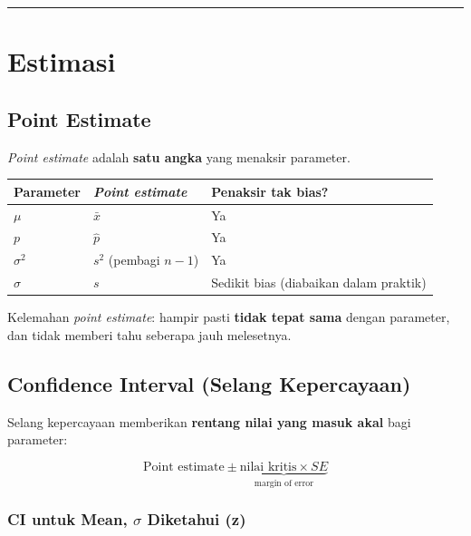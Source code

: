 \documentclass[
  indonesian,
  letterpaper,
]{book}
\newcounter{none} %
\begin{document}
\begin{center}\rule{0.5\linewidth}{0.5pt}\end{center}

\section{Estimasi}\label{estimasi}

\subsection{Point Estimate}\label{point-estimate}

\emph{Point estimate} adalah \textbf{satu angka} yang menaksir
parameter.

{\def\LTcaptype{none} %
\begin{longtable}[]{@{}lll@{}}
\toprule\noalign{}
Parameter & \emph{Point estimate} & Penaksir tak bias? \\
\midrule\noalign{}
\endhead
\bottomrule\noalign{}
\endlastfoot
\(\mu\) & \(\bar{x}\) & Ya \\
\(p\) & \(\hat{p}\) & Ya \\
\(\sigma^2\) & \(s^2\) (pembagi \(n-1\)) & Ya \\
\(\sigma\) & \(s\) & Sedikit bias (diabaikan dalam praktik) \\
\end{longtable}
}

Kelemahan \emph{point estimate}: hampir pasti \textbf{tidak tepat sama}
dengan parameter, dan tidak memberi tahu seberapa jauh melesetnya.

\subsection{Confidence Interval (Selang
Kepercayaan)}\label{confidence-interval-selang-kepercayaan}

Selang kepercayaan memberikan \textbf{rentang nilai yang masuk akal}
bagi parameter:

\[\text{Point estimate} \pm \underbrace{\text{nilai kritis} \times SE}_{\text{margin of error}}\]

\subsubsection{\texorpdfstring{\textbf{CI untuk Mean, \(\sigma\)
Diketahui
(z)}}{CI untuk Mean, \textbackslash sigma Diketahui (z)}}\label{ci-untuk-mean-sigma-diketahui-z}
\end{document}
